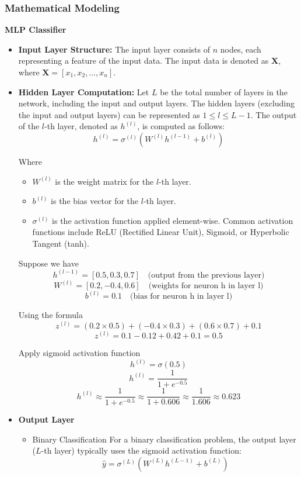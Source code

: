 \subsubsection{Mathematical Modeling}
\textbf{MLP Classifier }
\begin{itemize}
\item{\textbf{Input Layer Structure:}}
The input layer consists of $n$ nodes, each representing a feature of the input data. The input data is denoted as $\mathbf{X}$, where $\mathbf{X} = [x_1, x_2, \ldots, x_n]$.

\item{\textbf{Hidden Layer Computation:}}
Let $L$ be the total number of layers in the network, including the input and output layers. The hidden layers (excluding the input and output layers) can be represented as $1 \leq l \leq L - 1$. The output of the $l$-th layer, denoted as $h^{(l)}$, is computed as follows:
\begin{equation}
h^{(l)} = \sigma^{(l)}\left(W^{(l)}h^{(l-1)} + b^{(l)}\right)
\end{equation}

Where
\begin{itemize}
  \item $W^{(l)}$ is the weight matrix for the $l$-th layer.
  \item $b^{(l)}$ is the bias vector for the $l$-th layer.
  \item $\sigma^{(l)}$ is the activation function applied element-wise. Common activation functions include ReLU (Rectified Linear Unit), Sigmoid, or Hyperbolic Tangent (tanh).
\end{itemize}
Suppose we have
\[
h^{(l-1)} = [0.5, 0.3, 0.7] \quad \text{(output from the previous layer)}
\]
\[W^{(l)} = [0.2, -0.4, 0.6] \quad \text{(weights for neuron h in layer l)}
\]
\[b^{(l)} = 0.1 \quad \text{(bias for neuron h in layer l)}\]

Using the formula
\[
z^{(l)} = (0.2 \times 0.5) + (-0.4 \times 0.3) + (0.6 \times 0.7) + 0.1
\]
\[z^{(l)} = 0.1 - 0.12 + 0.42 + 0.1 = 0.5\]

\noindent Apply sigmoid activation function
\[
h^{(l)} = \sigma(0.5)
\]
\[h^{(l)} = \frac{1}{1 + e^{-0.5}}\]
\[h^{(l)} \approx \frac{1}{1 + e^{-0.5}} \approx \frac{1}{1 + 0.606} \approx \frac{1}{1.606} \approx 0.623\]
\item{\textbf{Output Layer}}
\begin{itemize}
    \item {Binary Classification}
For a binary classification problem, the output layer ($L$-th layer) typically uses the sigmoid activation function:
\begin{equation}
\hat{y} = \sigma^{(L)}\left(W^{(L)}h^{(L-1)} + b^{(L)}\right)
\end{equation}


\end{itemize}
\end{itemize}
